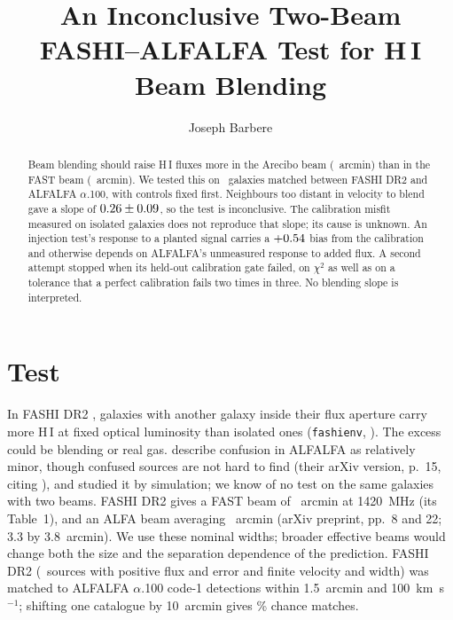 \documentclass[twocolumn]{aastex631}
\newcommand{\code}[1]{\texttt{#1}}
\begin{document}
\title{An Inconclusive Two-Beam FASHI--ALFALFA Test for H\,I Beam Blending}
\author[0009-0008-3289-4447]{Joseph Barbere}

\begin{abstract}
Beam blending should raise H\,I fluxes more in the Arecibo beam
(\hbRealBeamAlfa~arcmin) than in the FAST beam (\hbRealBeamFast~arcmin). We tested this on
\hbRealNTargets\ galaxies matched between FASHI DR2 and ALFALFA $\alpha$.100, with controls
fixed first. Neighbours too distant in velocity to blend gave a slope of
$0.26\pm0.09$, so the test is inconclusive. The
calibration misfit measured on isolated galaxies does not reproduce that slope; its cause is
unknown. An injection test's response to a planted signal carries a $+0.54$ bias from the
calibration and otherwise depends on ALFALFA's unmeasured response to added flux. A
second attempt stopped when its held-out calibration gate failed, on $\chi^2$ as well as on a
tolerance that a perfect calibration fails two times in three. No blending slope is interpreted.
\end{abstract}


\section{Test}
\label{sec:test}
In FASHI DR2 \citep{fashi_dr2}, galaxies with another galaxy inside their flux aperture carry
more H\,I at fixed optical luminosity than isolated ones (\code{fashienv},
\citealt{janskyresearch}). The excess could be blending or real gas. \citet{haynes2018}
describe confusion in ALFALFA as relatively minor, though confused sources are not hard to
find (their arXiv version, p.~15, citing \citealt{jones2016}), and \citet{jones2015} studied it by simulation; we know of no test on the
same galaxies with two beams. FASHI DR2 gives a FAST beam of \hbRealBeamFast~arcmin at
1420~MHz (its Table~1), and \citet{giovanelli2005} an ALFA beam averaging
\hbRealBeamAlfa~arcmin (arXiv preprint, pp.~8 and 22; 3.3 by 3.8~arcmin). We use these nominal
widths; broader effective beams would change both the size and the separation dependence of
the prediction. FASHI DR2 (\hbRealNFashi\ sources with positive flux and error and finite velocity and width) was matched to ALFALFA $\alpha$.100 code-1
detections \citep[\hbRealNAlfalfa\ sources in all;][]{haynes2018} within 1.5~arcmin and
100~km~s$^{-1}$; shifting one catalogue by 10~arcmin gives \hbRealChance\% chance matches.
\end{document}
